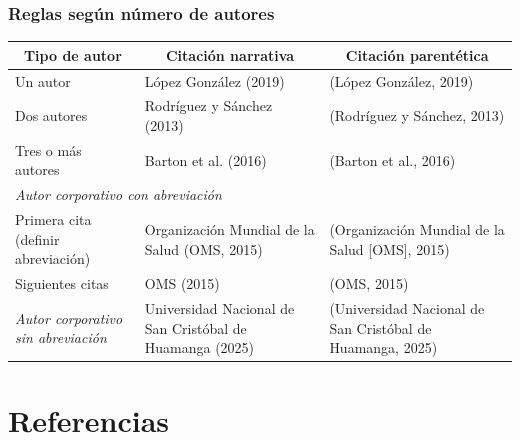 \documentclass[
11pt, %
]{beamer}
\begin{document}
\begin{frame}
	\frametitle{Reglas según número de autores}

	\begin{table}[]
		\centering
			\begin{tabular}{| m{2cm} | m{4cm} |m{4cm} |}
				\toprule
				\multicolumn{1}{c}{\textbf{Tipo de autor}} & \multicolumn{1}{c}{\textbf{Citación narrativa}}          & \multicolumn{1}{c}{\textbf{Citación  parentética}}        \\ \midrule
			\hline	Un autor                                   & López González (2019)                                    & (López González, 2019)                                    \\ \hline
			\hline	Dos autores                                & Rodríguez y Sánchez (2013)                               & (Rodríguez y Sánchez, 2013)                               \\ \hline
			\hline 	Tres o más autores                         & Barton et al. (2016)                                     & (Barton et al., 2016)                                     \\ \hline
				\multicolumn{3}{l}{\textit{Autor corporativo con abreviación}}                                                                                                    \\
				\hline Primera cita (definir abreviación)          & Organización Mundial de la Salud (OMS, 2015)             & (Organización Mundial de la Salud [OMS], 2015)            \\ \hline
				\hline Siguientes citas                           & OMS (2015)                                               & (OMS, 2015)                                               \\ \hline
				\textit{Autor corporativo sin abreviación} & Universidad Nacional de San Cristóbal de Huamanga (2025) & (Universidad Nacional de San Cristóbal de Huamanga, 2025) \\ \bottomrule
			\end{tabular}%
	\end{table}

\end{frame}

\section{Referencias}
\end{document}
